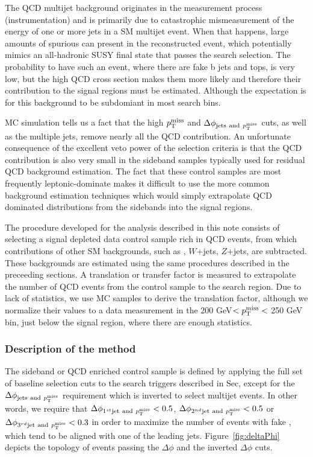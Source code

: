 %
%

The QCD multijet background originates in the measurement process (instrumentation) and is primarily due to catastrophic mismeasurement of the energy of one or more jets in a SM multijet event. When that happens, large amounts of spurious \MET can present in the reconstructed event, which potentially mimics an all-hadronic SUSY final state that passes the search selection. The probability to have such an event, where there are fake b jets and tops, is very low, but the high QCD cross section makes them more likely and therefore their contribution to the signal regions must be estimated. Although the expectation is for this background to be subdomiant in most search bins.

MC simulation tells us a fact that the high $p^{\rm miss}_{\rm T}$ and
$\Delta\phi_{\mathrm{jets~and}~p^{\rm miss}_{\rm T}}$ cuts, as well as the multiple jets, 
remove nearly all the QCD contribution. An unfortunate consequence of the excellent veto power of the selection
criteria is that the QCD contribution is also very small 
in the sideband samples typically used for residual QCD background 
estimation. The fact that these control samples are most frequently 
leptonic-\ttbar dominate makes it difficult to use the more common background 
estimation techniques which would simply extrapolate QCD dominated distributions 
from the sidebands into the signal regions. 

The procedure developed for the analysis described in this note consists
of selecting a signal depleted data control sample rich in QCD events, 
from which contributions of other SM backgrounds, such as \ttbar, $W$+jets, 
$Z$+jets, are subtracted. These backgrounds
are estimated using the same procedures described in the preceeding sections.  
A translation or transfer factor is measured to extrapolate the
number of QCD events from the control sample to the 
search region. Due to lack of statistics, we use MC samples to
derive the translation factor, although we normalize their values to a 
data measurement in the 200 GeV$<p^{\rm miss}_{\rm T}<$ 250 GeV bin, just below the 
signal region, where there are enough statistics.

\subsubsection{Description of the method}

The sideband or QCD enriched control sample is defined by applying 
the full set of baseline selection cuts to the search triggers described
in Sec, except for the $\Delta\phi_{\mathrm{jets~and}~p^{\rm miss}_{\rm T}}$ 
requirement which is inverted to select multijet events. In other words,
we require that
$\Delta\phi_{1^{st}\mathrm{jet~and}~p^{\rm miss}_{\rm T}} < 0.5$, 
$\Delta\phi_{2^{nd} \mathrm{jet~and}~p^{\rm miss}_{\rm T}} < 0.5$ or 
$\Delta\phi_{3^{rd} \mathrm{jet~and}~p^{\rm miss}_{\rm T}} < 0.3$ in order to maximize the 
number of events with fake \MET, which tend to be aligned with one of the 
leading jets.
Figure~\ref{fig:deltaPhi} depicts the topology of events passing the 
$\Delta\phi$ and the inverted $\Delta\phi$ cuts.

